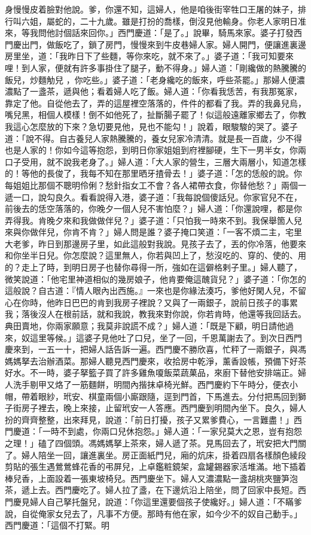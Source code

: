 \begin{showcontents}{}
身慢慢皮着臉對他說。爹，你還不知，這婦人，他是咱後街宰牲口王屠的妹子，排行叫六姐，屬蛇的，二十九歲。雖是打扮的喬樣，倒沒見他輸身。你老人家明日准來，等我問他討個話來回你。」西門慶道：「是了。」說畢，騎馬來家。婆子打發西門慶出門，做飯吃了，鎖了房門，慢慢來到牛皮巷婦人家。婦人開門，便讓進裏邊房里坐，道：「我昨日下了些麵，等你來吃，就不來了。」婆子道：「我可知要來哩！到人家，便就有許多事掛住了腿子，動不得身。」婦人道：「剛纔做的熱騰騰的飯兒，炒麵觔兒 ，你吃些。」婆子道：「老身纔吃的飯來，呼些茶罷。」那婦人便濃濃點了一盞茶，遞與他；看着婦人吃了飯。婦人道：「你看我恁苦，有我那冤家，靠定了他。自從他去了，弄的這屋裡空落落的，件件的都看了我。弄的我鼻兒烏，嘴兒黑，相個人模樣！倒不如他死了，扯斷腸子罷了！似這般遠離家鄉去了，你教我這心怎麼放的下來？急切要見他，見也不能勾！」說着，眼駿駿的哭了。婆子道：「說不得。自古養兒人家熱騰騰的，養女兒家冷清清。就是長一百歲，少不得也是人家的！你如今這等抱怨，到明日你家姐姐到府裡腳硬，生下一男半女，你兩口子受用，就不說我老身了。」婦人道：「大人家的營生，三層大兩層小，知道怎樣的！等他的長俊了，我每不知在那里晒牙揸骨去！」婆子道：「怎的恁般的說。你每姐姐比那個不聰明伶俐？愁針指女工不會？各人裙帶衣食，你替他愁？」兩個一遞一口，說勾良久。看看說得入港，婆子道：「我每說個傻話兒。你家官兒不在，前後去的恁空落落的，你晚夕一個人兒不害怕麼？」婦人道：「你還說哩，都是你弄得我。肯晚夕來和我做做伴兒？」婆子道：「只怕我一時來不到。我保舉箇人兒來與你做伴兒，你肯不肯？」婦人問是誰？婆子掩口笑道：「一客不煩二主，宅里大老爹，昨日到那邊房子里，如此這般對我說。見孩子去了，丟的你冷落，他要來和你坐半日兒。你怎麼說？這里無人，你若與凹上了，愁沒吃的、穿的、使的、用的？走上了時，到明日房子也替你尋得一所，強如在這僻格剌子里。」婦人聽了，微笑說道：「他宅里神道相似的幾房娘子，他肯要俺這醜貨兒？」婆子道：「你怎的這般說？自古道：『情人眼內出西施。』一來也是你緣法湊巧，爹他好閑人兒，不留心在你時，他昨日巴巴的肯到我房子裡說？又與了一兩銀子，說前日孩子的事累我；落後沒人在根前話，就和我說，教我來對你說，你若肯時，他還等我回話去。典田賣地，你兩家願意；我莫非說謊不成？」婦人道：「既是下顧，明日請他過來，奴這里等候。」這婆子見他吐了口兒，坐了一回，千恩萬謝去了。到次日西門慶來到，一五一十，把婦人話告訴一遍。西門慶不勝欣喜，忙秤了一兩銀子，與馮媽媽拏去治辦酒菜。那婦人聽見西門慶來，收拾房中乾淨，薰香設帳，預備下好茶好水。不一時，婆子拏籃子買了許多雞魚嗄飯菜蔬菓品，來廚下替他安排端正。婦人洗手剔甲又烙了一筋麵餅，明間內揩抹卓椅光鮮。西門慶約下午時分，便衣小帽，帶着眼紗，玳安、棋童兩個小廝跟隨，逕到門首，下馬進去。分付把馬回到獅子街房子裡去，晚上來接，止留玳安一人答應。西門慶到明間內坐下。良久，婦人扮的齊齊整整，出來拜見，說道：「前日打擾，孩子又累爹費心，一言難盡！」西門慶道：「一時不到處，你兩口兒休抱怨。」婦人道：「一家兒莫大之恩，豈有抱怨之理！」磕了四個頭。馮媽媽拏上茶來，婦人遞了茶。見馬回去了，玳安把大門關了。婦人陪坐一回，讓進裏坐。房正面紙門兒，廂的炕床，掛着四扇各樣顏色綾段剪貼的張生遇鶯鶯蜂花香的弔屏兒，上卓鑑粧鏡架，盒罐錫器家活堆滿。地下插着棒兒香，上面設着一張東坡椅兒。西門慶坐下。婦人又濃濃點一盞胡桃夾鹽笋泡茶，遞上去。西門慶吃了。婦人拉了盞，在下邊炕沿上陪坐，問了回家中長短。西門慶見婦人自己拏托盤兒，說道：「你這里還要個孩子使纔好。」婦人道：「不瞞爹說，自從俺家女兒去了，凡事不方便。那時有他在家，如今少不的奴自己動手。」西門慶道：「這個不打緊。明
\end{showcontents}
